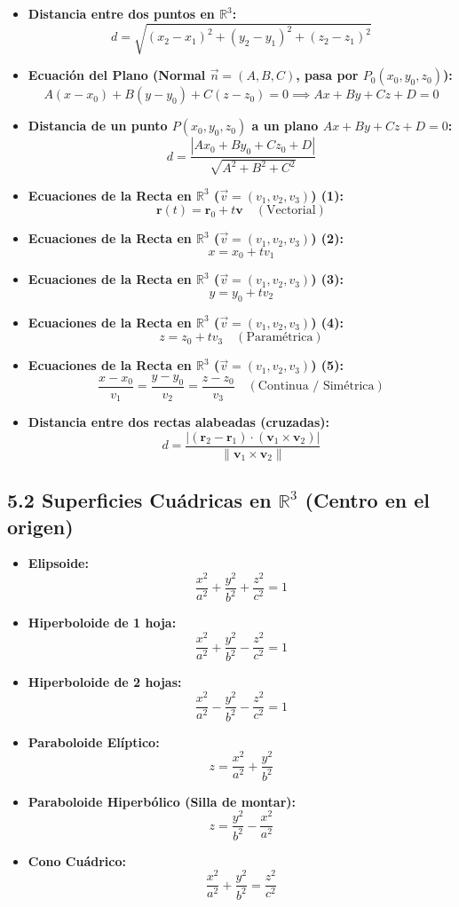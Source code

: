 \documentclass[11pt,a4paper]{article}
\begin{document}
\begin{itemize}
  \item \textbf{Distancia entre dos puntos en $\mathbb{R}^3$:}
  \[
    d = \sqrt{(x_2 - x_1)^2 + (y_2 - y_1)^2 + (z_2 - z_1)^2}
  \]
  \item \textbf{Ecuación del Plano (Normal $\vec{n} = (A, B, C)$, pasa por $P_0(x_0, y_0, z_0)$):}
  \[
    A(x - x_0) + B(y - y_0) + C(z - z_0) = 0 \implies Ax + By + Cz + D = 0
  \]
  \item \textbf{Distancia de un punto $P(x_0, y_0, z_0)$ a un plano $Ax + By + Cz + D = 0$:}
  \[
    d = \frac{|Ax_0 + By_0 + Cz_0 + D|}{\sqrt{A^2 + B^2 + C^2}}
  \]
  \item \textbf{Ecuaciones de la Recta en $\mathbb{R}^3$ ($\vec{v} = (v_1, v_2, v_3)$) (1):}
  \[
    \mathbf{r}(t) = \mathbf{r}_0 + t\mathbf{v} \quad (\text{Vectorial})
  \]
  \item \textbf{Ecuaciones de la Recta en $\mathbb{R}^3$ ($\vec{v} = (v_1, v_2, v_3)$) (2):}
  \[
    x = x_0 + tv_1
  \]
  \item \textbf{Ecuaciones de la Recta en $\mathbb{R}^3$ ($\vec{v} = (v_1, v_2, v_3)$) (3):}
  \[
    y = y_0 + tv_2
  \]
  \item \textbf{Ecuaciones de la Recta en $\mathbb{R}^3$ ($\vec{v} = (v_1, v_2, v_3)$) (4):}
  \[
    z = z_0 + tv_3 \quad (\text{Paramétrica})
  \]
  \item \textbf{Ecuaciones de la Recta en $\mathbb{R}^3$ ($\vec{v} = (v_1, v_2, v_3)$) (5):}
  \[
    \frac{x - x_0}{v_1} = \frac{y - y_0}{v_2} = \frac{z - z_0}{v_3} \quad (\text{Continua / Simétrica})
  \]
  \item \textbf{Distancia entre dos rectas alabeadas (cruzadas):}
  \[
    d = \frac{|(\mathbf{r}_2 - \mathbf{r}_1) \cdot (\mathbf{v}_1 \times \mathbf{v}_2)|}{\|\mathbf{v}_1 \times \mathbf{v}_2\|}
  \]
\end{itemize}

\subsection*{5.2 Superficies Cuádricas en $\mathbb{R}^3$ (Centro en el origen)}

\begin{itemize}
  \item \textbf{Elipsoide:}
  \[
    \frac{x^2}{a^2} + \frac{y^2}{b^2} + \frac{z^2}{c^2} = 1
  \]
  \item \textbf{Hiperboloide de 1 hoja:}
  \[
    \frac{x^2}{a^2} + \frac{y^2}{b^2} - \frac{z^2}{c^2} = 1
  \]
  \item \textbf{Hiperboloide de 2 hojas:}
  \[
    \frac{x^2}{a^2} - \frac{y^2}{b^2} - \frac{z^2}{c^2} = 1
  \]
  \item \textbf{Paraboloide Elíptico:}
  \[
    z = \frac{x^2}{a^2} + \frac{y^2}{b^2}
  \]
  \item \textbf{Paraboloide Hiperbólico (Silla de montar):}
  \[
    z = \frac{y^2}{b^2} - \frac{x^2}{a^2}
  \]
  \item \textbf{Cono Cuádrico:}
  \[
    \frac{x^2}{a^2} + \frac{y^2}{b^2} = \frac{z^2}{c^2}
  \]
\end{itemize}
\end{document}
